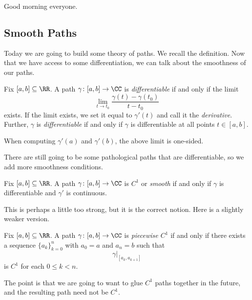 \documentclass[../notes.tex]{subfiles}
\begin{document}

Good morning everyone.

\subsection{Smooth Paths}
Today we are going to build some theory of paths. We recall the definition.
\pathdef*
\noindent Now that we have access to some differentiation, we can talk about the smoothness of our paths.
\begin{definition}
	Fix $[a,b]\subseteq\RR$. A path $\gamma\colon [a,b]\to\CC$ is \textit{differentiable} if and only if the limit
	\[\lim_{t\to t_0}\frac{\gamma(t)-\gamma(t_0)}{t-t_0}\]
	exists. If the limit exists, we set it equal to $\gamma'(t)$ and call it the \textit{derivative}. Further, $\gamma$ is \textit{differentiable} if and only if $\gamma$ is differentiable at all points $t\in[a,b]$.
\end{definition}
\begin{remark}
	When computing $\gamma'(a)$ and $\gamma'(b)$, the above limit is one-sided.
\end{remark}
There are still going to be some pathological paths that are differentiable, so we add more smoothness conditions.
\begin{defihelper}[\texorpdfstring{$C^1$}{C1}] 
	Fix $[a,b]\subseteq\RR$. A path $\gamma\colon [a,b]\to\CC$ is \textit{$C^1$} or \textit{smooth} if and only if $\gamma$ is differentiable and $\gamma'$ is continuous.
\end{defihelper}
This is perhaps a little too strong, but it is the correct notion. Here is a slightly weaker version.
\begin{definition}
	Fix $[a,b]\subseteq\RR$. A path $\gamma\colon [a,b]\to\CC$ is \textit{piecewise $C^1$} if and only if there exists a sequence $\{a_k\}_{k=0}^n$ with $a_0=a$ and $a_n=b$ such that
	\[\gamma|_{[a_k,a_{k+1}]}\]
	is $C^1$ for each $0\le k<n$.
\end{definition}
The point is that we are going to want to glue $C^1$ paths together in the future, and the resulting path need not be $C^1$.
\end{document}
